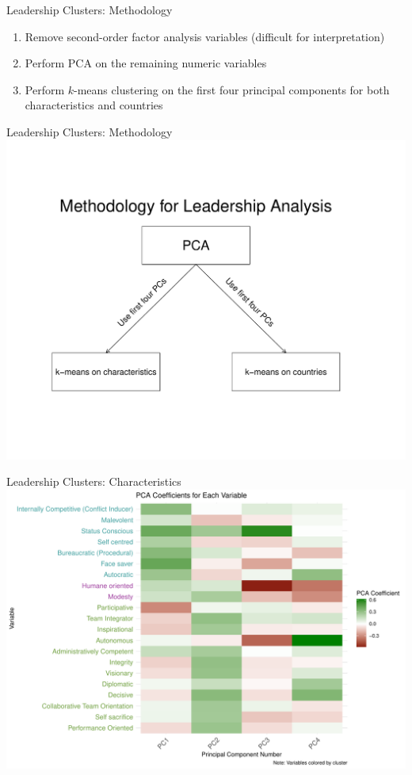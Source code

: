 \documentclass[
  ignorenonframetext,
]{beamer}
\providecommand{\tightlist}{%
  \setlength{\itemsep}{0pt}\setlength{\parskip}{0pt}}
\begin{document}
\begin{frame}{Leadership Clusters: Methodology}
\protect\hypertarget{leadership-clusters-methodology}{}
\begin{enumerate}
\tightlist
\item
  Remove second-order factor analysis variables (difficult for
  interpretation)
\item
  Perform PCA on the remaining numeric variables
\item
  Perform \(k\)-means clustering on the first four principal components
  for both characteristics and countries
\end{enumerate}
\end{frame}

\begin{frame}{Leadership Clusters: Methodology}
\protect\hypertarget{leadership-clusters-methodology-1}{}
\includegraphics{final_slides_files/figure-beamer/leader_methods-1.pdf}
\end{frame}

\begin{frame}{Leadership Clusters: Characteristics}
\protect\hypertarget{leadership-clusters-characteristics}{}
\includegraphics{final_slides_files/figure-beamer/pca_heatmap-1.pdf}
\end{frame}
\end{document}
